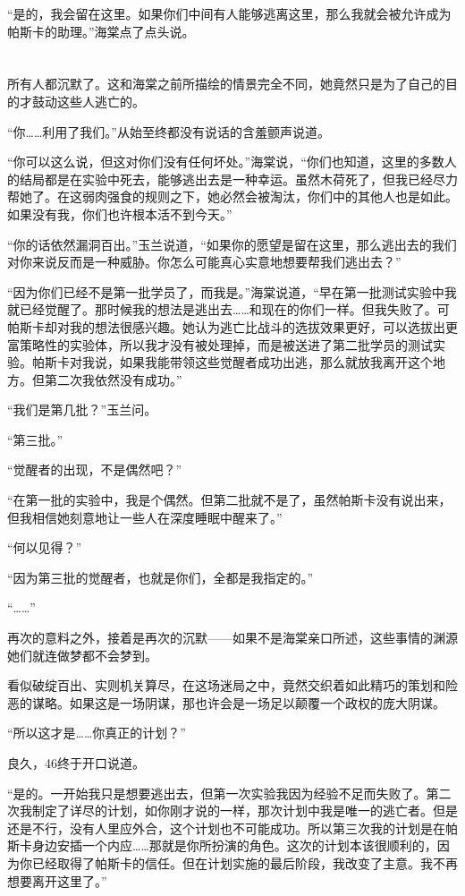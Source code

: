 “是的，我会留在这里。如果你们中间有人能够逃离这里，那么我就会被允许成为帕斯卡的助理。”海棠点了点头说。

\section*{}

所有人都沉默了。这和海棠之前所描绘的情景完全不同，她竟然只是为了自己的目的才鼓动这些人逃亡的。

“你……利用了我们。”从始至终都没有说话的含羞颤声说道。

“你可以这么说，但这对你们没有任何坏处。”海棠说，“你们也知道，这里的多数人的结局都是在实验中死去，能够逃出去是一种幸运。虽然木荷死了，但我已经尽力帮她了。在这弱肉强食的规则之下，她必然会被淘汰，你们中的其他人也是如此。如果没有我，你们也许根本活不到今天。”

“你的话依然漏洞百出。”玉兰说道，“如果你的愿望是留在这里，那么逃出去的我们对你来说反而是一种威胁。你怎么可能真心实意地想要帮我们逃出去？”

“因为你们已经不是第一批学员了，而我是。”海棠说道，“早在第一批测试实验中我就已经觉醒了。那时候我的想法是逃出去……和现在的你们一样。但我失败了。可帕斯卡却对我的想法很感兴趣。她认为逃亡比战斗的选拔效果更好，可以选拔出更富策略性的实验体，所以我才没有被处理掉，而是被送进了第二批学员的测试实验。帕斯卡对我说，如果我能带领这些觉醒者成功出逃，那么就放我离开这个地方。但第二次我依然没有成功。”

“我们是第几批？”玉兰问。

“第三批。”

“觉醒者的出现，不是偶然吧？”

“在第一批的实验中，我是个偶然。但第二批就不是了，虽然帕斯卡没有说出来，但我相信她刻意地让一些人在深度睡眠中醒来了。”

“何以见得？”

“因为第三批的觉醒者，也就是你们，全都是我指定的。”

“……”

再次的意料之外，接着是再次的沉默——如果不是海棠亲口所述，这些事情的渊源她们就连做梦都不会梦到。

看似破绽百出、实则机关算尽，在这场迷局之中，竟然交织着如此精巧的策划和险恶的谋略。如果这是一场阴谋，那也许会是一场足以颠覆一个政权的庞大阴谋。

“所以这才是……你真正的计划？”

良久，46终于开口说道。

“是的。一开始我只是想要逃出去，但第一次实验我因为经验不足而失败了。第二次我制定了详尽的计划，如你刚才说的一样，那次计划中我是唯一的逃亡者。但是还是不行，没有人里应外合，这个计划也不可能成功。所以第三次我的计划是在帕斯卡身边安插一个内应……那就是你所扮演的角色。这次的计划本该很顺利的，因为你已经取得了帕斯卡的信任。但在计划实施的最后阶段，我改变了主意。我不再想要离开这里了。”

